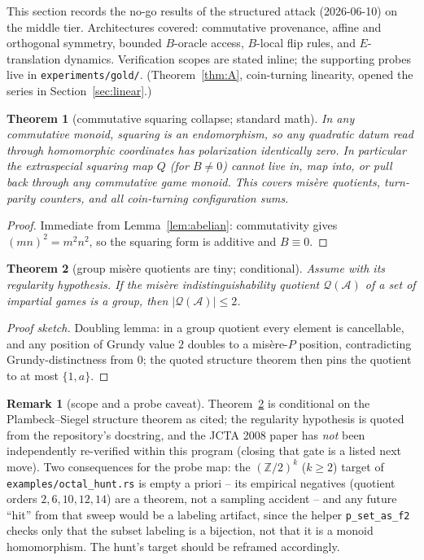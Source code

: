 \documentclass[11pt]{article}
\theoremstyle{plain}
\newtheorem{nogo}{Theorem}
\theoremstyle{definition}
\newtheorem{remark}{Remark}
\begin{document}
This section records the no-go results of the structured attack
(2026-06-10) on the middle tier. Architectures covered: commutative
provenance, affine and orthogonal symmetry, bounded $B$-oracle access,
$B$-local flip rules, and $E$-translation dynamics. Verification scopes are
stated inline; the supporting probes live in \texttt{experiments/gold/}.
(Theorem~\ref{thm:A}, coin-turning linearity, opened the series in
Section~\ref{sec:linear}.)

\begin{nogo}[commutative squaring collapse; standard math]\label{thm:B}
In any commutative monoid, squaring is an endomorphism, so any quadratic
datum read through homomorphic coordinates has polarization identically
zero. In particular the extraspecial squaring map $Q$ (for $B\neq0$) cannot
live in, map into, or pull back through any commutative game monoid. This
covers misère quotients, turn-parity counters, and all coin-turning
configuration sums.
\end{nogo}

\begin{proof}
Immediate from Lemma~\ref{lem:abelian}: commutativity gives
$(mn)^2=m^2n^2$, so the squaring form is additive and $B\equiv0$.
\end{proof}

\begin{nogo}[group misère quotients are tiny; conditional]\label{thm:C}
Assume \cite[Thm.~6.4]{PS} with its regularity hypothesis. If the misère
indistinguishability quotient $\mathcal{Q}(\mathcal{A})$ of a set of
impartial games is a group, then $|\mathcal{Q}(\mathcal{A})|\leq 2$.
\end{nogo}

\begin{proof}[Proof sketch]
Doubling lemma: in a group quotient every element is cancellable, and any
position of Grundy value $2$ doubles to a misère-$P$ position,
contradicting Grundy-distinctness from $0$; the quoted structure theorem
then pins the quotient to at most $\{1,a\}$.
\end{proof}

\begin{remark}[scope and a probe caveat]\label{rem:thmC}
Theorem~\ref{thm:C} is conditional on the Plambeck--Siegel structure
theorem as cited; the regularity hypothesis is quoted from the repository's
 docstring, and the JCTA 2008 paper has
\emph{not} been independently re-verified within this program (closing that
gate is a listed next move). Two consequences for the probe map: the
$(\mathbb{Z}/2)^k$ ($k\geq2$) target of \texttt{examples/octal\_hunt.rs} is
empty a priori -- its empirical negatives (quotient orders
$2,6,10,12,14$) are a theorem, not a sampling accident -- and any future
``hit'' from that sweep would be a labeling artifact, since the helper
\texttt{p\_set\_as\_f2} checks only that the subset labeling is a bijection,
not that it is a monoid homomorphism. The hunt's target should be reframed
accordingly.
\end{remark}
\end{document}
